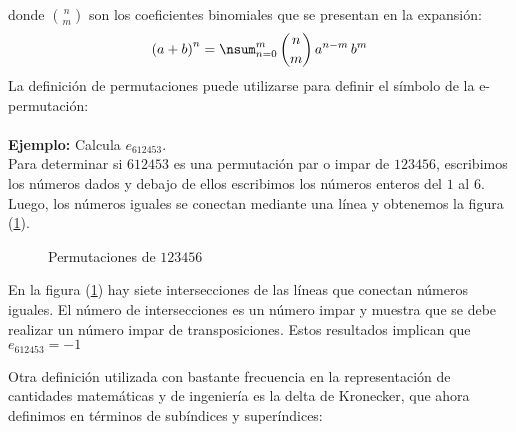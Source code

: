 donde $\displaystyle \binom{n}{m}$ son los coeficientes binomiales que se presentan en la expansión:
\begin{align*}
\left( a + b \right)^{n} = \nsum_{n=0}^{m} \, \binom{n}{m} \, a^{n-m} \, b^{m}
\end{align*}
La definición de permutaciones puede utilizarse para definir el símbolo de la e-permutación:
\\[1em]
\noindent{}
\\[1em]
\noindent
\textbf{Ejemplo: } Calcula $e_{612453}$.
\\[1em]
\noindent
Para determinar si $612453$ es una permutación par o impar de $123456$, escribimos los números dados y debajo de ellos escribimos los números enteros del $1$ al $6$. Luego, los números iguales se conectan mediante una línea y obtenemos la figura (\ref{fig:figura_01_02}).
\begin{figure}[H]
    \centering
    \caption{Permutaciones de $123456$}
    \label{fig:figura_01_02}
\end{figure}
En la figura (\ref{fig:figura_01_02}) hay siete intersecciones de las líneas que conectan números iguales. El número de intersecciones es un número impar y muestra que se debe realizar un número impar de transposiciones. Estos resultados implican que $e_{612453} = -1$
\par
Otra definición utilizada con bastante frecuencia en la representación de cantidades matemáticas y de ingeniería es la delta de Kronecker, que ahora definimos en términos de subíndices y superíndices:

